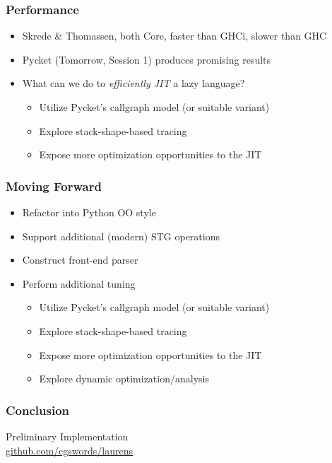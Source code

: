 \documentclass[xetex,serif,mathserif]{beamer}
\newenvironment{slide}[1]{\begin{frame}\frametitle{#1}}{\end{frame}}
\begin{document}
\begin{slide}{Performance}
  \begin{itemize}
    \item Skrede \& Thomassen, both Core, faster than GHCi, slower than GHC
    \item Pycket (Tomorrow, Session 1) produces promising results
    \item What can we do to \emph{efficiently JIT} a lazy language?
    \begin{itemize}
      \item Utilize Pycket's callgraph model (or suitable variant)
      \item Explore stack-shape-based tracing
      \item Expose more optimization opportunities to the JIT
    \end{itemize}
  \end{itemize}
\end{slide}

\begin{slide}{Moving Forward}
  \begin{itemize}
    \item Refactor into Python OO style
    \item Support additional (modern) STG operations
    \item Construct front-end parser
    \item Perform additional tuning
    \begin{itemize}
      \item Utilize Pycket's callgraph model (or suitable variant)
      \item Explore stack-shape-based tracing
      \item Expose more optimization opportunities to the JIT
      \item Explore dynamic optimization/analysis
    \end{itemize}
  \end{itemize}
\end{slide}

\begin{slide}{Conclusion}
    \begin{center}
        \textbf{}

        \vspace{2em}
        Preliminary Implementation\\\href{github.com/cgswords/laurens}{github.com/cgswords/laurens}
    \end{center}
\end{slide}
\end{document}
